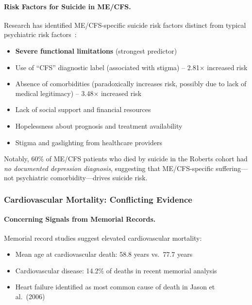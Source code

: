 \paragraph{Risk Factors for Suicide in ME/CFS.}
Research has identified ME/CFS-specific suicide risk factors distinct from typical psychiatric risk factors~\cite{Brown2020}:

\begin{itemize}
    \item \textbf{Severe functional limitations} (strongest predictor)
    \item Use of ``CFS'' diagnostic label (associated with stigma) -- 2.81$\times$ increased risk
    \item Absence of comorbidities (paradoxically increases risk, possibly due to lack of medical legitimacy) -- 3.48$\times$ increased risk
    \item Lack of social support and financial resources
    \item Hopelessness about prognosis and treatment availability
    \item Stigma and gaslighting from healthcare providers
\end{itemize}

Notably, 60\% of ME/CFS patients who died by suicide in the Roberts cohort had \textit{no documented depression diagnosis}, suggesting that ME/CFS-specific suffering---not psychiatric comorbidity---drives suicide risk.

\subsubsection{Cardiovascular Mortality: Conflicting Evidence}

\paragraph{Concerning Signals from Memorial Records.}
Memorial record studies suggest elevated cardiovascular mortality:
\begin{itemize}
    \item Mean age at cardiovascular death: 58.8 years vs.\ 77.7 years~\cite{McManimen2016}
    \item Cardiovascular disease: 14.2\% of deaths in recent memorial analysis~\cite{Sirotiak2025}
    \item Heart failure identified as most common cause of death in Jason et al.\ (2006)~\cite{Jason2006}
\end{itemize}

